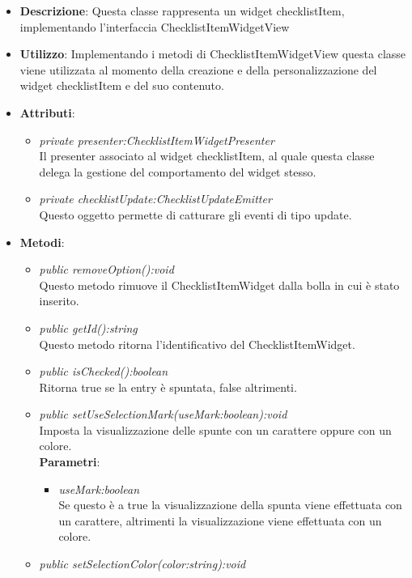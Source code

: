 \begin{itemize}
\item \textbf{Descrizione}: Questa classe rappresenta un widget checklistItem, implementando l'interfaccia ChecklistItemWidgetView
\item \textbf{Utilizzo}: Implementando i metodi di ChecklistItemWidgetView questa classe viene utilizzata al momento della creazione e della personalizzazione del widget checklistItem e del suo contenuto.
\item \textbf{Attributi}:
	\begin{itemize}
	\item \textit{private presenter:ChecklistItemWidgetPresenter}\\
	Il presenter associato al widget checklistItem, al quale questa classe delega la gestione del comportamento del widget stesso.
	\item \textit{private checklistUpdate:ChecklistUpdateEmitter}\\
	Questo oggetto permette di catturare gli eventi di tipo update.
	\end{itemize}
\item \textbf{Metodi}:
	\begin{itemize}
	\item \textit{public removeOption():void}\\
	Questo metodo rimuove il ChecklistItemWidget dalla bolla in cui è stato inserito.
	\item \textit{public getId():string}\\
	Questo metodo ritorna l'identificativo del ChecklistItemWidget.
	\item \textit{public isChecked():boolean}\\
	Ritorna true se la entry è spuntata, false altrimenti.
	\item \textit{public setUseSelectionMark(useMark:boolean):void}\\
	Imposta la visualizzazione delle spunte con un carattere oppure con un colore.
		\\ \textbf{Parametri}: \begin{itemize}
		\item \textit{useMark:boolean}\\
		Se questo è a true la visualizzazione della spunta viene effettuata con un carattere, altrimenti la visualizzazione viene effettuata con un colore.
		\end{itemize}  
	\item \textit{public setSelectionColor(color:string):void}\\

\end{itemize}
\end{itemize}
